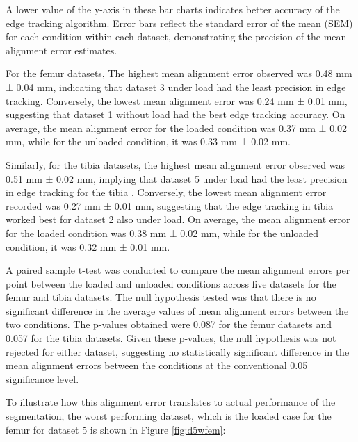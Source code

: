 \documentclass{micro-econ-thesis}
\begin{document}
A lower value of the y-axis in these bar charts indicates better accuracy of the edge tracking algorithm. Error bars reflect the standard error of the mean (SEM) for each condition within each dataset, demonstrating the precision of the mean alignment error estimates.  

For the femur datasets, The highest mean alignment error observed was 0.48 mm ± 0.04 mm, indicating that dataset 3 under load had the least precision in edge tracking. Conversely, the lowest mean alignment error was 0.24 mm ± 0.01 mm, suggesting that dataset 1 without load had the best edge tracking accuracy. On average, the mean alignment error for the loaded condition was 0.37 mm ± 0.02 mm, while for the unloaded condition, it was 0.33 mm ± 0.02 mm.

Similarly, for the tibia datasets, the highest mean alignment error observed was 0.51 mm ± 0.02 mm, implying that dataset 5 under load had the least precision in edge tracking for the tibia . Conversely, the lowest mean alignment error recorded was 0.27 mm ± 0.01 mm, suggesting that the edge tracking in tibia worked best for dataset 2 also under load. On average, the mean alignment error for the loaded condition was 0.38 mm ± 0.02 mm, while for the unloaded condition, it was 0.32 mm ± 0.01 mm.

A paired sample t-test was conducted to compare the mean alignment errors per point between the loaded and unloaded conditions across five datasets for the femur and tibia datasets. The null hypothesis tested was that there is no significant difference in the average values of mean alignment errors between the two conditions. The p-values obtained were 0.087 for the femur datasets and 0.057 for the tibia datasets. Given these p-values, the null hypothesis was not rejected for either dataset, suggesting no statistically significant difference in the mean alignment errors between the conditions at the conventional 0.05 significance level.
   
To illustrate how this alignment error translates to actual performance of the segmentation, the worst performing dataset, which is the loaded case for the femur for dataset 5 is shown in Figure \ref{fig:d5wfem}: 
\end{document}
